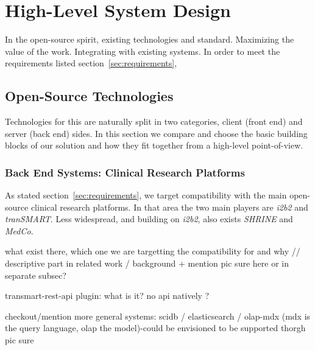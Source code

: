 \chapter{High-Level System Design}
\label{sec:sysdesign}

In the open-source spirit, existing technologies and standard. Maximizing the value of the work. 
Integrating with existing systems.
In order to meet the requirements listed section~\ref{sec:requirements}, 


\section{Open-Source Technologies}
Technologies for this are naturally split in two categories, client (front end) and server (back end) sides.
In this section we compare and choose the basic building blocks of our solution and how they fit together from a high-level point-of-view.

\subsection{Back End Systems: Clinical Research Platforms}
As stated section~\ref{sec:requirements}, we target compatibility with the main open-source clinical research platforms. 
In that area the two main players are \emph{i2b2} and \emph{tranSMART}.
Less widespread, and building on \emph{i2b2}, also exists \emph{SHRINE} and \emph{MedCo}.





what exist there, which one we are targetting the compatibility for and why // descriptive part in related work / background
+ mention pic sure here or in separate subsec?

transmart-rest-api plugin: what is it? no api natively ?

checkout/mention more general systems: scidb / elasticsearch / olap-mdx (mdx is the query language, olap the model)-could be envisioned to be supported thorgh pic sure


